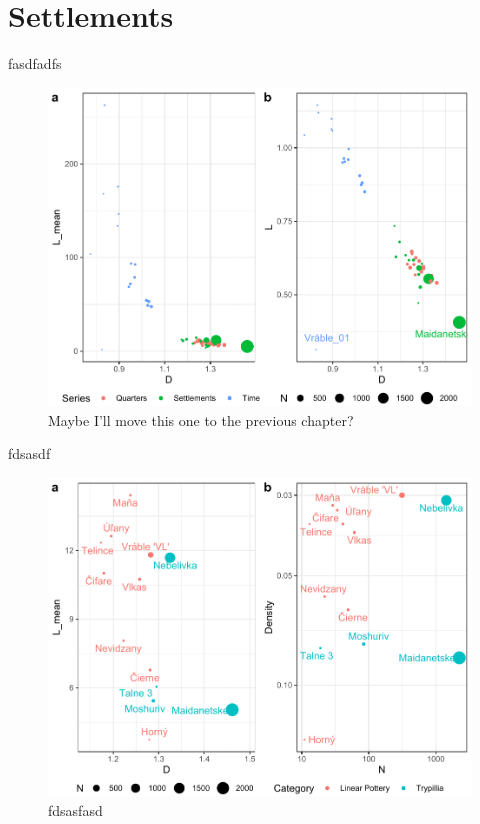 \documentclass[
  12pt,
]{book}
\begin{document}
\hypertarget{settlements-1}{%
\section{Settlements}\label{settlements-1}}

fasdfadfs



\begin{figure}

{\centering \includegraphics[width=0.9\linewidth]{bookdown-demo_files/figure-latex/09-all-1} 

}

\caption{Maybe I'll move this one to the previous chapter?}\label{fig:09-all}
\end{figure}

fdsasdf



\begin{figure}

{\centering \includegraphics[width=0.9\linewidth]{bookdown-demo_files/figure-latex/09-settle-points-1} 

}

\caption{fdsasfasd}\label{fig:09-settle-points}
\end{figure}
\end{document}
